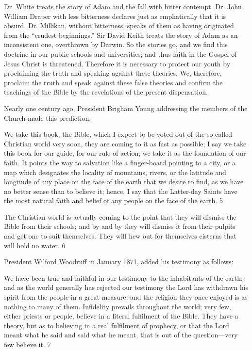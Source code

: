 Dr. White treats the story of Adam and the fall with bitter contempt. Dr. John William
Draper with less bitterness declares just as emphatically that it is absurd. Dr. Millikan,
without bitterness, speaks of them as having originated from the ``crudest beginnings.'' Sir
David Keith treats the story of Adam as an inconsistent one, overthrown by Darwin. So the
stories go, and we find this doctrine in our public schools and universities; and thus faith in
the Gospel of Jesus Christ is threatened. Therefore it is necessary to protect our youth by
proclaiming the truth and speaking against these theories. We, therefore, proclaim the truth
and speak against these false theories and confirm the teachings of the Bible by the
revelations of the present dispensation.

Nearly one century ago, President Brigham Young addressing the members of the Church
made this prediction:

We take this book, the Bible, which I expect to be voted out of the so-called Christian world
very soon, they are coming to it as fast as possible; I say we take this book for our guide, for
our rule of action; we take it as the foundation of our faith. It points the way to salvation like
a finger-board pointing to a city, or a map which designates the locality of mountains, rivers,
or the latitude and longitude of any place on the face of the earth that we desire to find, as we
have no better sense than to believe it; hence, I say that the Latter-day Saints have the most
natural faith and belief of any people on the face of the earth. 5

The Christian world is actually coming to the point that they will dismiss the Bible from their
schools; and by and by they will dismiss it from their pulpits and get one to suit themselves.
They will hew out for themselves cisterns that will hold no water. 6

President Wilford Woodruff in January 1871, added his testimony as follows:

We have been true and faithful in our testimony to the inhabitants of the earth; and as the
world generally has rejected our testimony the Lord has withdrawn his spirit from the people
in a great measure; and the religion they once enjoyed is as nothing to many of them.
Infidelity prevails throughout the world; very few, either priests or people, believe in a literal
fulfilment of the Bible. They have a theory, but as to believing in a real fulfilment of
prophecy, or that the Lord meant what he said and said what he meant, that is out of the
question—very few believe it. 7

